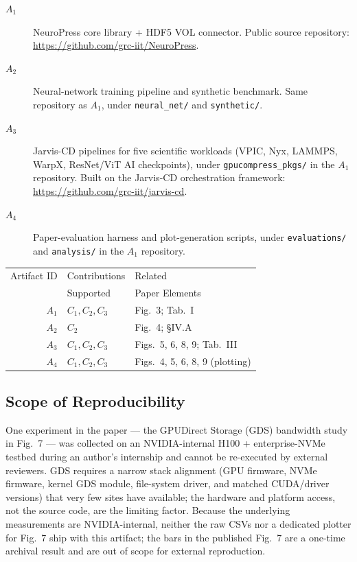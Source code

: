 \documentclass[conference]{IEEEtran}
\begin{document}
\begin{description}
\item[$A_1$] NeuroPress core library + HDF5 VOL connector.
  Public source repository:
  \url{https://github.com/grc-iit/NeuroPress}.
\item[$A_2$] Neural-network training pipeline and synthetic
  benchmark. Same repository as $A_1$, under
  \texttt{neural\_net/} and \texttt{synthetic/}.
\item[$A_3$] Jarvis-CD pipelines for five scientific workloads
  (VPIC, Nyx, LAMMPS, WarpX, ResNet/ViT AI checkpoints),
  under \texttt{gpucompress\_pkgs/} in the $A_1$ repository.
  Built on the Jarvis-CD orchestration framework:
  \url{https://github.com/grc-iit/jarvis-cd}.
\item[$A_4$] Paper-evaluation harness and plot-generation scripts,
  under \texttt{evaluations/} and \texttt{analysis/} in the $A_1$
  repository.
\end{description}

\begin{center}
\small
\setlength{\tabcolsep}{4pt}
\begin{tabular}{@{}rlp{}@{}}
\toprule
Artifact ID  &  Contributions &  Related \\
             &  Supported     &  Paper Elements \\
\midrule
$A_1$   &  $C_1, C_2, C_3$ & Fig.~3; Tab.~I \\
\midrule
$A_2$   &  $C_2$           & Fig.~4; \S IV.A \\
\midrule
$A_3$   &  $C_1, C_2, C_3$ & Figs.~5, 6, 8, 9; Tab.~III \\
\midrule
$A_4$   &  $C_1, C_2, C_3$ & Figs.~4, 5, 6, 8, 9 (plotting) \\
\bottomrule
\end{tabular}
\end{center}


\subsection{Scope of Reproducibility}

One experiment in the paper --- the GPUDirect Storage (GDS)
bandwidth study in Fig.~7 --- was collected on an
NVIDIA-internal H100 + enterprise-NVMe testbed during an
author's internship and cannot be re-executed by external
reviewers. GDS requires a narrow stack alignment (GPU
firmware, NVMe firmware, kernel GDS module, file-system
driver, and matched CUDA/driver versions) that very few sites
have available; the hardware and platform access, not the
source code, are the limiting factor. Because the underlying
measurements are NVIDIA-internal, neither the raw CSVs nor a
dedicated plotter for Fig.~7 ship with this artifact; the
bars in the published Fig.~7 are a one-time archival result
and are out of scope for external reproduction.
\end{document}

